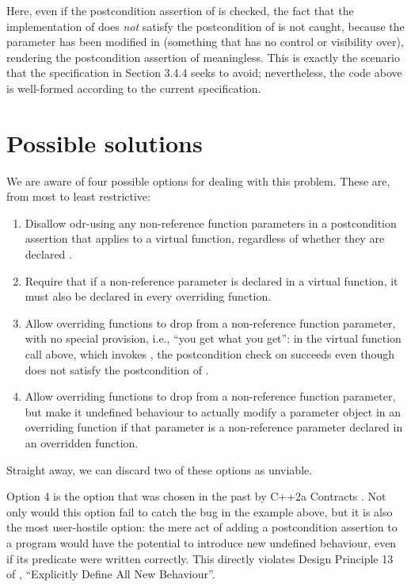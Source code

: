 \pagebreak %

Here, even if the postcondition assertion of  is checked, the fact that the implementation of  does \emph{not} satisfy the postcondition of  is not caught, because the parameter  has been modified in  (something that  has no control or visibility over), rendering the postcondition assertion of  meaningless. This is exactly the scenario that the specification in \cite{P2900R10} Section 3.4.4 seeks to avoid; nevertheless, the code above is well-formed according to the current specification.

\section{Possible solutions}

We are aware of four possible options for dealing with this problem. These are, from most to least restrictive:
\begin{enumerate}
\item Disallow odr-using any non-reference function parameters in a postcondition assertion that applies to a virtual function, regardless of whether they are declared .
\item Require that if a non-reference parameter is declared  in a virtual function, it must also be declared  in every overriding function.
\item Allow overriding functions to drop  from a non-reference function parameter, with no special provision, i.e., ``you get what you get'': in the virtual function call above, which invokes , the postcondition check on  succeeds even though  does not satisfy the postcondition of .
\item Allow overriding functions to drop  from a non-reference function parameter, but make it undefined behaviour to actually modify a parameter object in an overriding function if that parameter is a non-reference parameter declared  in an overridden function.
\end{enumerate}
Straight away, we can discard two of these options as unviable.

Option 4 is the option that was chosen in the past by C++2a Contracts \cite{P0542R5}. Not only would this option fail to catch the bug in the example above, but it is also the most user-hostile option: the mere act of adding a postcondition assertion to a program would have the potential to introduce new undefined behaviour, even if its predicate were written correctly. This directly violates Design Principle 13 of \cite{P2900R10}, ``Explicitly Define All New Behaviour''.


